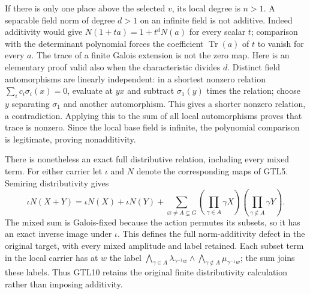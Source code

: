 If there is only one place above the selected $v$, its local
degree is $n>1$. A separable field norm of degree $d>1$ on an
infinite field is not additive. Indeed additivity would give
$N(1+ta)=1+t^dN(a)$ for every scalar $t$; comparison with the
determinant polynomial forces the coefficient
$\operatorname{Tr}(a)$ of $t$ to vanish for every $a$.
The trace of a finite Galois extension is not the zero map.
Here is an elementary proof valid also when the characteristic
divides $d$. Distinct field automorphisms are linearly independent:
in a shortest nonzero relation $\sum_i c_i\sigma_i(x)=0$,
evaluate at $yx$ and subtract $\sigma_1(y)$ times the relation;
choose $y$ separating $\sigma_1$ and another automorphism.
This gives a shorter nonzero relation, a contradiction.
Applying this to the sum of all local automorphisms proves
that trace is nonzero. Since the local base field is infinite,
the polynomial comparison is legitimate, proving nonadditivity.

There is nonetheless an exact full distributive relation,
including every mixed term. For either carrier let $\iota$ and
$N$ denote the corresponding maps of GTL5. Semiring
distributivity gives
\begin{equation}\tag{GTL10}
 \iota N(X+Y)=\iota N(X)+\iota N(Y)
  +\sum_{\varnothing\ne A\subsetneq G}
       \left(\prod_{\gamma\in A}\gamma X\right)
       \left(\prod_{\gamma\notin A}\gamma Y\right).
\end{equation}
The mixed sum is Galois-fixed because the action permutes its
subsets, so it has an exact inverse image under $\iota$. This
defines the full norm-additivity defect in the original target,
with every mixed amplitude and label retained. Each subset term
in the local carrier has at $w$ the label
$\bigwedge_{\gamma\in A}\lambda_{\gamma^{-1}w}
 \wedge\bigwedge_{\gamma\notin A}\mu_{\gamma^{-1}w}$;
the sum joins these labels. Thus GTL10 retains the original
finite distributivity calculation rather than imposing additivity.

